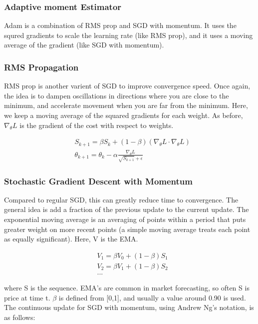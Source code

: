 \subsubsection{Adaptive moment Estimator}
Adam is a combination of RMS prop and SGD with momentum. It uses the squred gradients to scale the learning rate (like RMS prop), and it uses a moving average of the gradient (like SGD with momentum).

\subsubsection{RMS Propagation}
RMS prop is another varient of SGD to improve convergence speed. Once again, the idea is to dampen oscillations in directions where you are close to the minimum, and accelerate movement when you are far from the minimum. Here, we keep a moving average of the squared gradients for each weight. As before, $\nabla_\theta L$ is the gradient of the cost with respect to weights.

\begin{align}
    \label{eqn:RMS_Prop}
    & S_{k+1} = \beta S_k + (1 - \beta)(\nabla_\theta L \cdot \nabla_\theta L) \\
    & \theta_{k+1} = \theta_k - \alpha \frac{\nabla_\theta L}{\sqrt{S_{k+1}} + \epsilon}
\end{align}

\subsubsection{Stochastic Gradient Descent with Momentum}
Compared to regular SGD, this can greatly reduce time to convergence. The general idea is add a fraction of the previous update to the current update. The exponential moving average is an averaging of points within a period that puts greater weight on more recent points (a simple moving average treats each point as equally significant). Here, V is the EMA.

\begin{align}
    & V_1 = \beta V_0 + \left(1 - \beta \right) S_1 \\
    & V_2 = \beta V_1 + \left(1 - \beta \right) S_2 \\
    & ...
\end{align}

\noindent where S is the sequence. EMA's are common in market forecasting, so often S is price at time t.
$ \beta $ is defined from [0,1], and usually a value around 0.90 is used. The continuous update for SGD with momentum, using Andrew Ng's notation, is as follows:

